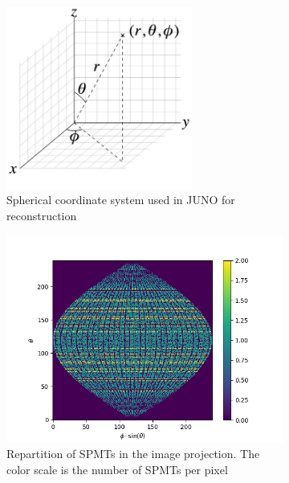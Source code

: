 \documentclass[../main.tex]{subfiles}
\begin{document}
\begin{figure}[ht]
  \centering
  \begin{subfigure}[t]{0.48\linewidth}
    \includegraphics[height=6cm]{images/juno/spherical_coordinate_system.png}
    \caption{Spherical coordinate system used in JUNO for reconstruction}
    \label{fig:jcnn:corrdinate_system}
  \end{subfigure}
  \hfill
  \begin{subfigure}[t]{0.48\linewidth}
    \includegraphics[width=\textwidth]{images/jcnn/pmt_repartition.png}
    \caption{Repartition of SPMTs in the image projection. The color scale is the number of SPMTs per pixel}
    \label{fig:jcnn:pmt_rep}
  \end{subfigure}
  \caption{}
\end{figure}
\end{document}
